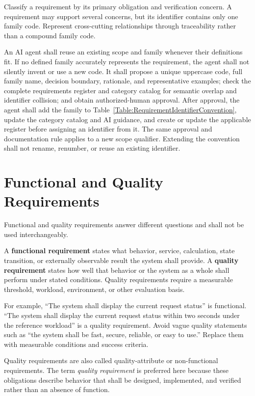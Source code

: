 Classify a requirement by its primary obligation and verification concern. A
requirement may support several concerns, but its identifier contains only one
family code. Represent cross-cutting relationships through traceability rather
than a compound family code.

An AI agent shall reuse an existing scope and family whenever their definitions
fit. If no defined family accurately represents the requirement, the agent
shall not silently invent or use a new code. It shall propose a unique uppercase
code, full family name, decision boundary, rationale, and representative
examples; check the complete requirements register and category catalog for
semantic overlap and identifier collision; and obtain authorized-human
approval. After approval, the agent shall add the family to
Table~\ref{Table:RequirementIdentifierConvention}, update the category catalog
and AI guidance, and create or update the applicable register before assigning
an identifier from it. The same approval and documentation rule applies to a
new scope qualifier. Extending the convention shall not rename, renumber, or
reuse an existing identifier.

\section{Functional and Quality Requirements}
Functional and quality requirements answer different questions and shall not be
used interchangeably.

\begin{dsnNote}
A \textbf{functional requirement} states what behavior, service, calculation,
state transition, or externally observable result the system shall provide. A
\textbf{quality requirement} states how well that behavior or the system as a
whole shall perform under stated conditions. Quality requirements require a
measurable threshold, workload, environment, or other evaluation basis.
\end{dsnNote}

For example, ``The system shall display the current request status'' is
functional. ``The system shall display the current request status within two
seconds under the reference workload'' is a quality requirement. Avoid vague
quality statements such as ``the system shall be fast, secure, reliable, or
easy to use.'' Replace them with measurable conditions and success criteria.

Quality requirements are also called quality-attribute or non-functional
requirements. The term \emph{quality requirement} is preferred here because
these obligations describe behavior that shall be designed, implemented, and
verified rather than an absence of function.

